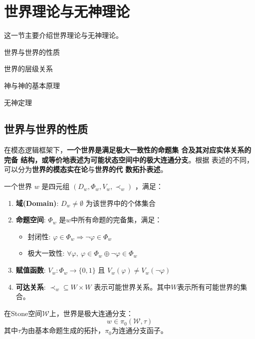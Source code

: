 \documentclass[lang=cn,newtx,10pt,scheme=chinese]{elegantbook}
\begin{document}
\section{世界理论与无神理论}
这一节主要介绍世界理论与无神理论。
\begin{introduction}
    \item 世界与世界的性质
    \item 世界的层级关系
    \item 神与神的基本原理
    \item 无神定理
\end{introduction}

\subsection{世界与世界的性质}
在模态逻辑框架下，\textbf{一个世界是满足极大一致性的命题集
    合及其对应实体关系的完备
    结构，或等价地表述为可能状态空间中的极大连通分支}。根据
表述的不同，可以分为\textbf{世界的模态实在论}与\textbf{世界的代
    数拓扑表述}。

\begin{definition}[世界的模态实在论]
    一个世界 $w$ 是四元组 $(D_w, \varPhi_w, V_w, \prec_w)$ ，满足：
    \begin{enumerate}
        \item \textbf{域(Domain)}: $D_w \neq \emptyset$ 为该世界中的个体集合
        \item \textbf{命题空间}: $\varPhi_w$ 是$w$中所有命题的完备集，满足：
              \begin{itemize}
                  \item 封闭性: $\varphi \in \varPhi_w \Rightarrow \neg\varphi \in \varPhi_w$
                  \item 极大一致性: $\forall\varphi,\ \varphi \in \varPhi_w \oplus \neg\varphi \in \varPhi_w$
              \end{itemize}
        \item \textbf{赋值函数}: $V_w: \varPhi_w \to \{0,1\}$ 且 $V_w(\varphi) \neq V_w(\neg\varphi)$
        \item \textbf{可达关系}: $\prec_w \subseteq W \times W$ 表示可能世界关系。其中\(W\)表示所有可能世界的集合。
    \end{enumerate}
\end{definition}

\begin{definition}[世界的代数拓扑表述]
    在Stone空间$\mathcal{W}$上，世界是极大连通分支：
    \[ w \in \pi_0(\mathcal{W}, \tau) \]
    其中$\tau$为由基本命题生成的拓扑，$\pi_0$为连通分支函子。
\end{definition}
\end{document}
